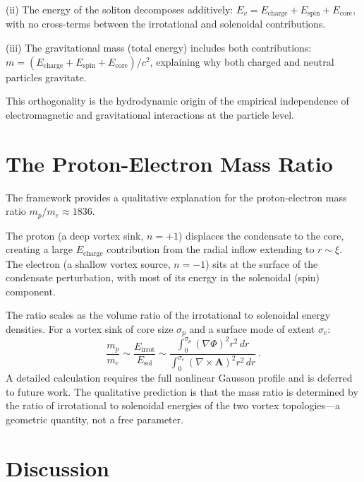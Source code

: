\documentclass[12pt, a4paper]{article}
\begin{document}
(ii) The energy of the soliton decomposes additively:
$E_v = E_{\mathrm{charge}} + E_{\mathrm{spin}}
+ E_{\mathrm{core}}$, with no cross-terms between
the irrotational and solenoidal contributions.

(iii) The gravitational mass (total energy) includes
both contributions:
$m = (E_{\mathrm{charge}} + E_{\mathrm{spin}}
+ E_{\mathrm{core}})/c^2$, explaining why both
charged and neutral particles gravitate.

This orthogonality is the hydrodynamic origin of the
empirical independence of electromagnetic and
gravitational interactions at the particle level.


\section{The Proton-Electron Mass Ratio}
\label{sec:mass_ratio}

The framework provides a qualitative explanation for
the proton-electron mass ratio $m_p/m_e \approx 1836$.

The proton (a deep vortex sink, $n = +1$) displaces
the condensate to the core, creating a large
$E_{\mathrm{charge}}$ contribution from the radial
inflow extending to $r \sim \xi$. The electron (a
shallow vortex source, $n = -1$) sits at the surface
of the condensate perturbation, with most of its
energy in the solenoidal (spin) component.

The ratio scales as the volume ratio of the
irrotational to solenoidal energy densities. For a
vortex sink of core size $\sigma_p$ and a surface
mode of extent $\sigma_e$:
\begin{equation}
    \frac{m_p}{m_e} \sim
    \frac{E_{\mathrm{irrot}}}{E_{\mathrm{sol}}}
    \sim \frac{\int_0^{\sigma_p}
    (\nabla\Phi)^2 r^2\,dr}
    {\int_0^{\sigma_e}
    (\nabla\times\mathbf{A})^2 r^2\,dr}\,.
\label{eq:mass_ratio}
\end{equation}
A detailed calculation requires the full nonlinear
Gausson profile and is deferred to future work. The
qualitative prediction is that the mass ratio is
determined by the ratio of irrotational to solenoidal
energies of the two vortex topologies---a geometric
quantity, not a free parameter.


\section{Discussion}
\label{sec:discussion}
\end{document}
